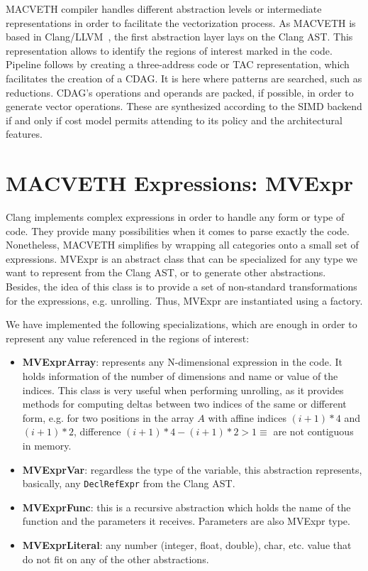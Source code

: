 MACVETH compiler handles different abstraction levels or intermediate
representations in order to facilitate the vectorization process. As MACVETH is 
based in Clang/LLVM~\cite{bib:LLVM}, the first abstraction layer lays on the 
Clang AST. This representation allows to identify the regions of interest 
marked in the code. Pipeline follows by creating a three-address code or TAC 
representation, which facilitates the creation of a CDAG. It is here where 
patterns are searched, such as reductions. CDAG's operations and operands are 
packed, if possible, in order to generate vector operations. These are 
synthesized according to the SIMD backend if and only if 
cost model permits attending to its policy and the architectural features.

\section{MACVETH Expressions: MVExpr}
Clang implements complex expressions in order to handle any form or type of
code. They
provide many possibilities
when it comes to parse exactly the code. Nonetheless, MACVETH simplifies by 
wrapping all categories onto a small set of expressions. MVExpr is an abstract 
class that can be specialized for any type we
want to represent from the Clang AST, or to generate other abstractions. 
Besides, the idea of this class is to
provide a set of non-standard transformations for the expressions, e.g.
unrolling. Thus, MVExpr are instantiated using a factory.

We have implemented the following specializations, which are enough in order to
represent any value referenced in the regions of interest:

\begin{itemize}
	\item \textbf{MVExprArray}: represents any N-dimensional expression in the
	      code. It
	      holds information of the number of dimensions and name or value of the
	      indices. This class is very useful when performing unrolling, as it 
	      provides methods for computing deltas between two indices of the same 
	      or different form, e.g. for two positions in the array $A$ with 
	      affine indices $(i+1)*4$ and $(i+1)*2$, difference $(i+1)*4 - (i+1)*2 
	      > 1 \equiv$ are not
	      contiguous in memory.
	\item \textbf{MVExprVar}: regardless the type of the variable, this
	      abstraction
	      represents, basically, any \texttt{DeclRefExpr} from the Clang AST.
	\item \textbf{MVExprFunc}: this is a recursive abstraction which holds the
			name of the function and the parameters it receives. Parameters are 
			also MVExpr type. 

	\item \textbf{MVExprLiteral}: any number (integer, float, double), char, 
	etc. value that do not fit on any of the other abstractions.
\end{itemize}

